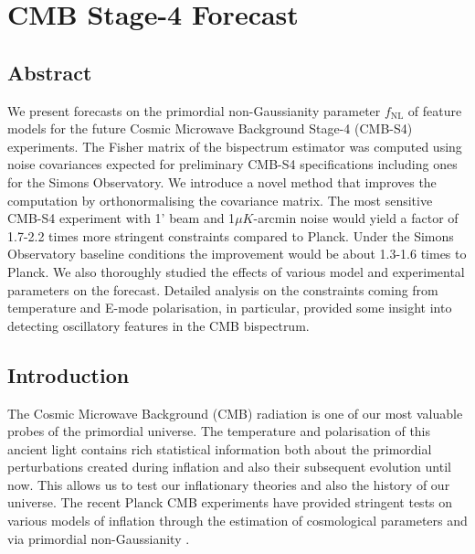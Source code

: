 \chapter{CMB Stage-4 Forecast}
\label{chapter:CMB_state-4_forecast}

\ifpdf
    \graphicspath{{Chapter4/Figs/Raster/}{Chapter4/Figs/PDF/}{Chapter4/Figs/}}
\else
    \graphicspath{{Chapter4/Figs/Vector/}{Chapter4/Figs/}}
\fi


\section{Abstract}
	
	We present forecasts on the primordial non-Gaussianity parameter $f_\text{NL}$ of feature models for the future Cosmic Microwave Background Stage-4 (CMB-S4) experiments. The Fisher matrix of the bispectrum estimator was computed using noise covariances expected for preliminary CMB-S4 specifications including ones for the Simons Observatory. We introduce a novel method that improves the computation by orthonormalising the covariance matrix. The most sensitive CMB-S4 experiment with 1' beam and 1$\mu K$-arcmin noise would yield a factor of 1.7-2.2 times more stringent constraints compared to Planck. Under the Simons Observatory baseline conditions the improvement would be about 1.3-1.6 times to Planck. We also thoroughly studied the effects of various model and experimental parameters on the forecast. Detailed analysis on the constraints coming from temperature and E-mode polarisation, in particular, provided some insight into detecting oscillatory features in the CMB bispectrum.


\section{Introduction}

The Cosmic Microwave Background (CMB) radiation is one of our most valuable probes of the primordial universe. The temperature and polarisation of this ancient light contains rich statistical information both about the primordial perturbations created during inflation and also their subsequent evolution until now.  This allows us to test our inflationary theories and also the history of our universe. The recent Planck CMB experiments have provided stringent tests on various models of inflation through the estimation of cosmological parameters and via primordial non-Gaussianity \cite{PlanckCollaboration2015,PlanckCollaboration2018}.

